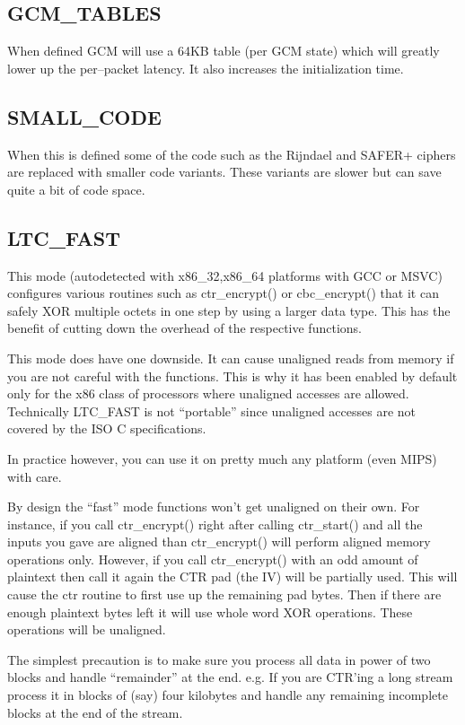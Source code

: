 \documentclass[a4paper]{book}
\begin{document}
\subsection{GCM\_TABLES}
When defined GCM will use a 64KB table (per GCM state) which will greatly lower up the per--packet latency.  
It also increases the initialization time.  

\subsection{SMALL\_CODE}
When this is defined some of the code such as the Rijndael and SAFER+ ciphers are replaced with smaller code variants.
These variants are slower but can save quite a bit of code space.

\subsection{LTC\_FAST}
This mode (autodetected with x86\_32,x86\_64 platforms with GCC or MSVC) configures various routines such as ctr\_encrypt() or 
cbc\_encrypt() that it can safely XOR multiple octets in one step by using a larger data type.  This has the benefit of 
cutting down the overhead of the respective functions.  

This mode does have one downside.  It can cause unaligned reads from memory if you are not careful with the functions.  This is why
it has been enabled by default only for the x86 class of processors where unaligned accesses are allowed.  Technically LTC\_FAST
is not ``portable'' since unaligned accesses are not covered by the ISO C specifications.

In practice however, you can use it on pretty much any platform (even MIPS) with care.

By design the ``fast'' mode functions won't get unaligned on their own.  For instance, if you call ctr\_encrypt() right after calling
ctr\_start() and all the inputs you gave are aligned than ctr\_encrypt() will perform aligned memory operations only.  However, if you 
call ctr\_encrypt() with an odd amount of plaintext then call it again the CTR pad (the IV) will be partially used.  This will
cause the ctr routine to first use up the remaining pad bytes.  Then if there are enough plaintext bytes left it will use 
whole word XOR operations.  These operations will be unaligned.

The simplest precaution is to make sure you process all data in power of two blocks and handle ``remainder'' at the end.  e.g. If you are 
CTR'ing a long stream process it in blocks of (say) four kilobytes and handle any remaining incomplete blocks at the end of the stream.  
\end{document}
